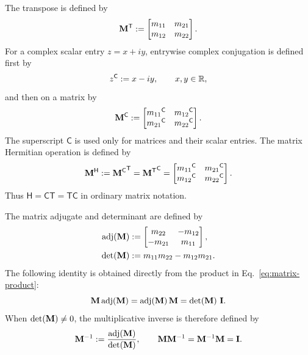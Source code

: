 The transpose is defined by
\begin{equation}
{\mathbf{M}}^{\mathsf T}
:=
\begin{bmatrix}
m_{11}&m_{21}\\
m_{12}&m_{22}
\end{bmatrix}.
\label{eq:matrix-transpose}
\end{equation}
For a complex scalar entry \(z=x+iy\), entrywise complex conjugation is
defined first by
\begin{equation}
{z}^{\mathsf C}:=x-iy,
\qquad x,y\in\mathbb{R},
\label{eq:matrix-entry-conjugate}
\end{equation}
and then on a matrix by
\begin{equation}
{\mathbf{M}}^{\mathsf C}
:=
\begin{bmatrix}
{m_{11}}^{\mathsf C}&{m_{12}}^{\mathsf C}\\
{m_{21}}^{\mathsf C}&{m_{22}}^{\mathsf C}
\end{bmatrix}.
\label{eq:matrix-conjugate}
\end{equation}
The superscript \(\mathsf C\) is used only for matrices and their scalar
entries. The matrix Hermitian operation is defined by
\begin{equation}
{\mathbf{M}}^{\mathsf H}
:={{\mathbf{M}}^{\mathsf C}}^{\mathsf T}
={{\mathbf{M}}^{\mathsf T}}^{\mathsf C}
=
\begin{bmatrix}
{m_{11}}^{\mathsf C}&{m_{21}}^{\mathsf C}\\
{m_{12}}^{\mathsf C}&{m_{22}}^{\mathsf C}
\end{bmatrix}.
\label{eq:matrix-hermitian}
\end{equation}
Thus \(\mathsf H=\mathsf C\mathsf T=\mathsf T\mathsf C\) in ordinary
matrix notation.

The matrix adjugate and determinant are defined by
\begin{align}
\operatorname{adj}\!\left(\mathbf{M}\right)
&:=
\begin{bmatrix}
m_{22}&-m_{12}\\
-m_{21}&m_{11}
\end{bmatrix},
\label{eq:matrix-adjugate}\\
\operatorname{det}\!\left(\mathbf{M}\right)
&:=m_{11}m_{22}-m_{12}m_{21}.
\label{eq:matrix-determinant}
\end{align}
The following identity is obtained directly from the product in
Eq.\ \eqref{eq:matrix-product}:
\begin{equation}
\mathbf{M}\operatorname{adj}\!\left(\mathbf{M}\right)
=\operatorname{adj}\!\left(\mathbf{M}\right)\mathbf{M}
=\operatorname{det}\!\left(\mathbf{M}\right)\,\mathbf{I}.
\label{eq:matrix-adjugate-product}
\end{equation}
When \(\operatorname{det}\!\left(\mathbf{M}\right)\neq0\), the multiplicative inverse is therefore
defined by
\begin{equation}
\mathbf{M}^{-1}
:=\frac{\operatorname{adj}\!\left(\mathbf{M}\right)}{\operatorname{det}\!\left(\mathbf{M}\right)},
\qquad
\mathbf{M}\mathbf{M}^{-1}
=\mathbf{M}^{-1}\mathbf{M}
=\mathbf{I}.
\label{eq:matrix-inverse}
\end{equation}

